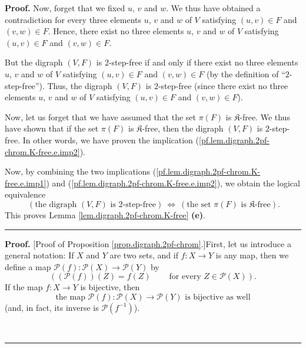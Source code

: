 \documentclass[numbers=enddot,12pt,final,onecolumn,notitlepage]{scrartcl}%
\theoremstyle{definition}
\newenvironment{proof}[1][Proof]{\noindent\textbf{#1.} }{\ \rule{0.5em}{0.5em}}
\newenvironment{verlong}{}{}
\begin{document}
\begin{verlong}
\begin{proof}
Now, forget that we fixed $u$, $v$ and $w$. We thus have obtained a
contradiction for every three elements $u$, $v$ and $w$ of $V$ satisfying
$\left(  u,v\right)  \in F$ and $\left(  v,w\right)  \in F$. Hence, there
exist no three elements $u$, $v$ and $w$ of $V$ satisfying $\left(
u,v\right)  \in F$ and $\left(  v,w\right)  \in F$.

But the digraph $\left(  V,F\right)  $ is $2$-step-free if and only if there
exist no three elements $u$, $v$ and $w$ of $V$ satisfying $\left(
u,v\right)  \in F$ and $\left(  v,w\right)  \in F$ (by the definition of
\textquotedblleft$2$-step-free\textquotedblright). Thus, the digraph $\left(
V,F\right)  $ is $2$-step-free (since there exist no three elements $u$, $v$
and $w$ of $V$ satisfying $\left(  u,v\right)  \in F$ and $\left(  v,w\right)
\in F$).

Now, let us forget that we have assumed that the set $\pi\left(  F\right)  $
is $\mathfrak{K}$-free. We thus have shown that if the set $\pi\left(
F\right)  $ is $\mathfrak{K}$-free, then the digraph $\left(  V,F\right)  $ is
$2$-step-free. In other words, we have proven the implication
(\ref{pf.lem.digraph.2pf-chrom.K-free.e.imp2}).

Now, by combining the two implications
(\ref{pf.lem.digraph.2pf-chrom.K-free.e.imp1}) and
(\ref{pf.lem.digraph.2pf-chrom.K-free.e.imp2}), we obtain the logical
equivalence%
\[
\ \left(  \text{the digraph }\left(  V,F\right)  \text{ is }2\text{-step-free}%
\right)  \ \Longleftrightarrow\ \left(  \text{the set }\pi\left(  F\right)
\text{ is }\mathfrak{K}\text{-free}\right)  .
\]
This proves Lemma \ref{lem.digraph.2pf-chrom.K-free} \textbf{(e)}.
\end{proof}

\begin{proof}
[Proof of Proposition \ref{prop.digraph.2pf-chrom}.]First, let us introduce a
general notation: If $X$ and $Y$ are two sets, and if $f:X\rightarrow Y$ is
any map, then we define a map $\mathcal{P}\left(  f\right)  :\mathcal{P}%
\left(  X\right)  \rightarrow\mathcal{P}\left(  Y\right)  $ by%
\[
\left(  \left(  \mathcal{P}\left(  f\right)  \right)  \left(  Z\right)
=f\left(  Z\right)  \ \ \ \ \ \ \ \ \ \ \text{for every }Z\in\mathcal{P}%
\left(  X\right)  \right)  .
\]
If the map $f:X\rightarrow Y$ is bijective, then%
\begin{equation}
\text{the map }\mathcal{P}\left(  f\right)  :\mathcal{P}\left(  X\right)
\rightarrow\mathcal{P}\left(  Y\right)  \text{ is bijective as well}
\label{pf.prop.digraph.2pf-chrom.P(f)bij}%
\end{equation}
(and, in fact, its inverse is $\mathcal{P}\left(  f^{-1}\right)  $).


\end{proof}
\end{verlong}
\end{document}
